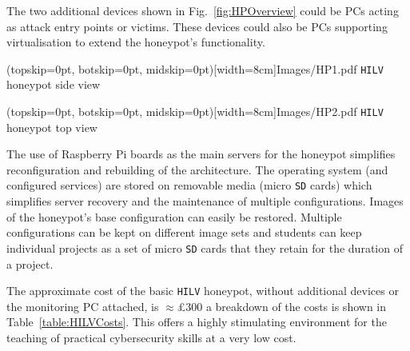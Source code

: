 \documentclass{ieeeaccess}
\begin{document}
The two additional devices shown in Fig.~\ref{fig:HPOverview} could be PCs
acting as attack entry points or victims. These devices could also be PCs
supporting virtualisation to extend the honeypot's functionality.

\Figure[t!](topskip=0pt, botskip=0pt, midskip=0pt)[width=8cm]{Images/HP1.pdf}
{\texttt{HILV} honeypot side view\label{fig:HP1}}

\Figure[t!](topskip=0pt, botskip=0pt, midskip=0pt)[width=8cm]{Images/HP2.pdf}
{\texttt{HILV} honeypot top view\label{fig:HP2}}



The use of Raspberry Pi boards as the main servers for the honeypot simplifies
reconfiguration and rebuilding of the architecture.  The operating system (and
configured services) are stored on removable media (micro \texttt{SD} cards) which
simplifies server recovery and the maintenance of multiple configurations.
Images of the honeypot's base configuration can easily be restored. Multiple
configurations can be kept on different image sets and students can keep
individual projects as a set of micro \texttt{SD} cards that they retain for the
duration of a project.

The approximate cost of the basic \texttt{HILV} honeypot, without additional
devices or the monitoring PC attached, is $\approx$\pounds300 a breakdown of
the costs is shown in Table~\ref{table:HILVCosts}. This offers a highly
stimulating environment for the teaching of practical cybersecurity skills at a
very low cost.
\end{document}
